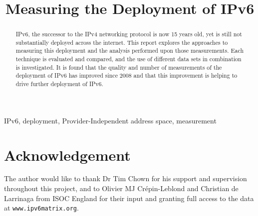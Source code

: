 \documentclass[10pt, final, conference, a4paper]{IEEEtran}
\begin{document}
\title{Measuring the Deployment of IPv6}

\author{
}



\maketitle


\begin{abstract}
IPv6, the successor to the IPv4 networking protocol is now 15 years old, yet is
still not substantially deployed across the internet. This report explores the
approaches to measuring this deployment and the analysis performed upon those
measurements. Each technique is evaluated and compared, and the use of different
data sets in combination is investigated. It is found that the quality and
number of measurements of the deployment of IPv6 has improved since 2008 and
that this improvement is helping to drive further deployment of IPv6. 
\end{abstract}

\begin{IEEEkeywords}
IPv6, deployment, Provider-Independent address space, measurement
\end{IEEEkeywords}







\section{Acknowledgement}

The author would like to thank Dr Tim Chown for his support and supervision
throughout this project, and to Olivier MJ Crépin-Leblond and Christian de
Larrinaga from ISOC England for their input and granting full access to the
data at \verb+www.ipv6matrix.org+.



{}
\end{document}
